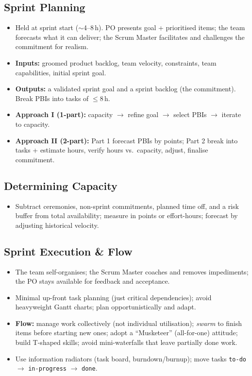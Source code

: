 \documentclass[hidelinks]{article}
\begin{document}
\subsection{Sprint Planning}
\begin{itemize}
  \item Held at sprint start ($\sim$4--8\,h). PO presents goal + prioritised items; the team
        forecasts what it can deliver; the Scrum Master facilitates and challenges the commitment
        for realism.
  \item \textbf{Inputs:} groomed product backlog, team velocity, constraints, team capabilities,
        initial sprint goal.
  \item \textbf{Outputs:} a validated sprint goal and a sprint backlog (the commitment). Break PBIs
        into tasks of $\le$8\,h.
  \item \textbf{Approach I (1-part):} capacity $\to$ refine goal $\to$ select PBIs $\to$ iterate to capacity.
  \item \textbf{Approach II (2-part):} Part 1 forecast PBIs by points; Part 2 break into tasks +
        estimate hours, verify hours vs.\ capacity, adjust, finalise commitment.
\end{itemize}

\subsection{Determining Capacity}
\begin{itemize}
  \item Subtract ceremonies, non-sprint commitments, planned time off, and a risk buffer from total
        availability; measure in points or effort-hours; forecast by adjusting historical velocity.
\end{itemize}

\subsection{Sprint Execution \& Flow}
\begin{itemize}
  \item The team self-organises; the Scrum Master coaches and removes impediments; the PO stays
        available for feedback and acceptance.
  \item Minimal up-front task planning (just critical dependencies); avoid heavyweight Gantt charts;
        plan opportunistically and adapt.
  \item \textbf{Flow:} manage work collectively (not individual utilisation); \emph{swarm} to finish
        items before starting new ones; adopt a ``Musketeer'' (all-for-one) attitude; build T-shaped
        skills; avoid mini-waterfalls that leave partially done work.
  \item Use information radiators (task board, burndown/burnup); move tasks
        \texttt{to-do} $\to$ \texttt{in-progress} $\to$ \texttt{done}.
\end{itemize}
\end{document}
